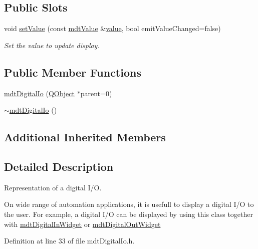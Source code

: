 \subsection*{Public Slots}
\begin{DoxyCompactItemize}
\item 
void \hyperlink{classmdt_digital_io_a5bb40caa30bd967fdacd16d9f6654fd3}{set\-Value} (const \hyperlink{classmdt_value}{mdt\-Value} \&\hyperlink{classmdt_abstract_io_a839b0d3a4a1d4616e5b20d744c5f75a1}{value}, bool emit\-Value\-Changed=false)
\begin{DoxyCompactList}\small\item\em Set the value to update display. \end{DoxyCompactList}\end{DoxyCompactItemize}
\subsection*{Public Member Functions}
\begin{DoxyCompactItemize}
\item 
\hyperlink{classmdt_digital_io_ab5cca7698845624d99f94052d87790bb}{mdt\-Digital\-Io} (\hyperlink{class_q_object}{Q\-Object} $\ast$parent=0)
\item 
\hyperlink{classmdt_digital_io_a1397b14299334202786dbffee63bc208}{$\sim$mdt\-Digital\-Io} ()
\end{DoxyCompactItemize}
\subsection*{Additional Inherited Members}


\subsection{Detailed Description}
Representation of a digital I/\-O. 

On wide range of automation applications, it is usefull to display a digital I/\-O to the user. For example, a digital I/\-O can be displayed by using this class together with \hyperlink{classmdt_digital_in_widget}{mdt\-Digital\-In\-Widget} or \hyperlink{classmdt_digital_out_widget}{mdt\-Digital\-Out\-Widget} 

Definition at line 33 of file mdt\-Digital\-Io.\-h.



